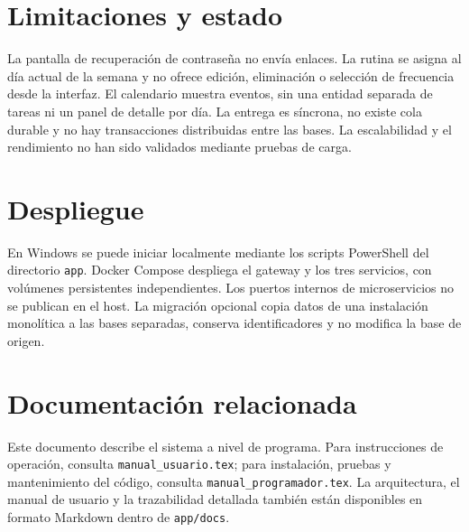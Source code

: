 \documentclass[12pt,a4paper]{article}
\begin{document}
\section{Limitaciones y estado}
La pantalla de recuperación de contraseña no envía enlaces. La rutina se asigna al día actual de la semana y no ofrece edición, eliminación o selección de frecuencia desde la interfaz. El calendario muestra eventos, sin una entidad separada de tareas ni un panel de detalle por día. La entrega es síncrona, no existe cola durable y no hay transacciones distribuidas entre las bases. La escalabilidad y el rendimiento no han sido validados mediante pruebas de carga.

\section{Despliegue}
En Windows se puede iniciar localmente mediante los scripts PowerShell del directorio \texttt{app}. Docker Compose despliega el gateway y los tres servicios, con volúmenes persistentes independientes. Los puertos internos de microservicios no se publican en el host. La migración opcional copia datos de una instalación monolítica a las bases separadas, conserva identificadores y no modifica la base de origen.

\section{Documentación relacionada}
Este documento describe el sistema a nivel de programa. Para instrucciones de operación, consulta \texttt{manual\_usuario.tex}; para instalación, pruebas y mantenimiento del código, consulta \texttt{manual\_programador.tex}. La arquitectura, el manual de usuario y la trazabilidad detallada también están disponibles en formato Markdown dentro de \texttt{app/docs}.
\end{document}
